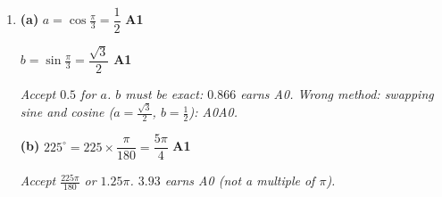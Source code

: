 \documentclass[12pt, twoside]{article}
\begin{document}
\begin{enumerate}[itemsep=0.3cm]
\textbf{(a)} $A\hat{C}B = 180^\circ - 68^\circ - 47^\circ = 65^\circ$ \hfill \textbf{A1}

\textbf{(b)} $\dfrac{AC}{\sin 47^\circ} = \dfrac{40}{\sin 65^\circ}$ \hfill \textbf{M1A1}

$AC = 32.3\,\text{m}$ \quad ($32.2783\ldots$) \hfill \textbf{A1}

\emph{M1 for the sine rule, A1 for pairing $AC$ with $47^\circ$ and $40$
with $65^\circ$. Wrong method: pairing $AC$ with $68^\circ$ gives $40.9$,
which is $BC$: M1A0A0. FT from (a).}

\textbf{(c)} $\text{Area} = \frac{1}{2}(40)(32.2783\ldots)\sin 68^\circ$ \hfill \textbf{M1}

$\text{Area} = 599\,\text{m}^{2}$ \quad ($598.559\ldots$) \hfill \textbf{A1}

\emph{M1 for two sides with the angle between them. Wrong method: using
$\sin 65^\circ$ with $AB$ and $AC$ gives $585$: M0A0. FT from (b).}

\textbf{(d)} $\frac{1}{2}(24)(35)\sin\theta = 320$ \hfill \textbf{M1}

$\sin\theta = \frac{16}{21}$, \quad acute value $49.6^\circ$ \hfill \textbf{(A1)}

$\theta = 180^\circ - 49.6324\ldots^\circ = 130^\circ$ \quad ($130.367\ldots$) \hfill \textbf{A1}

\emph{Giving only the acute value $49.6^\circ$ earns M1A1A0. A1 for $130$
(3 s.f.) or the display with an ellipsis; $130.4$ with no ellipsis earns
A0.}

\newpage

\item[3.] [Maximum mark: 10]

\textbf{(a)} $a = \cos\frac{\pi}{3} = \dfrac{1}{2}$ \hfill \textbf{A1}

$b = \sin\frac{\pi}{3} = \dfrac{\sqrt{3}}{2}$ \hfill \textbf{A1}

\emph{Accept $0.5$ for $a$. $b$ must be exact: $0.866$ earns A0. Wrong
method: swapping sine and cosine ($a = \frac{\sqrt{3}}{2}$,
$b = \frac{1}{2}$): A0A0.}

\textbf{(b)} $225^\circ = 225 \times \dfrac{\pi}{180} = \dfrac{5\pi}{4}$ \hfill \textbf{A1}

\emph{Accept $\frac{225\pi}{180}$ or $1.25\pi$. $3.93$ earns A0 (not a
multiple of $\pi$).}


\end{enumerate}
\end{document}
